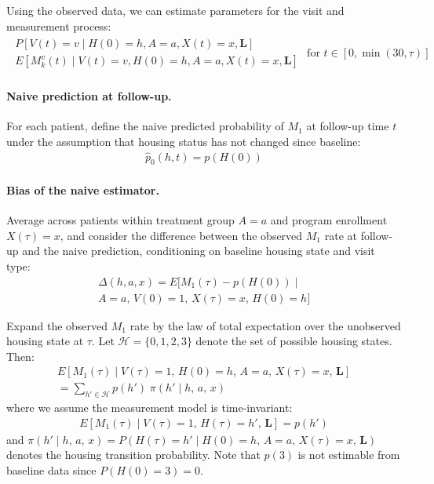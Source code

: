 Using the observed data, we can estimate parameters for the visit and measurement process:
\begin{align*}
    \begin{split}
    P[V(t)=v \mid H(0)=h, A=a, X(t)=x, \boldsymbol{L}] \\
    E[M_k^v(t) \mid V(t)=v, H(0)=h, A=a, X(t)=x, \boldsymbol{L}]
    \end{split} \text{ for } t \in [0, \min(30, \tau)]
\end{align*}

\paragraph{Naive prediction at follow-up.} For each patient, define the naive predicted probability of $M_1$ at follow-up time $t$ under the assumption that housing status has not changed since baseline:
\begin{align*}
    \widehat{p}_0(h, t) = p(H(0))
\end{align*}

\paragraph{Bias of the naive estimator.} Average across patients within treatment group $A=a$ and program enrollment $X(\tau)=x$, and consider the difference between the observed $M_1$ rate at follow-up and the naive prediction, conditioning on baseline housing state and visit type:
\begin{multline*}
    \Delta(h, a, x) = E\big[M_1(\tau) - p(H(0)) \mid \\
    A=a,\, V(0)=1,\, X(\tau)=x,\, H(0)=h\big]
\end{multline*}

Expand the observed $M_1$ rate by the law of total expectation over the unobserved housing state at $\tau$. Let $\mathcal{H} = \{0, 1, 2, 3\}$ denote the set of possible housing states. Then:
\begin{multline*}
    E[M_1(\tau) \mid V(\tau)=1,\, H(0)=h,\, A=a,\, X(\tau)=x,\, \boldsymbol{L}] \\
    = \sum_{h' \in \mathcal{H}} p(h') \; \pi(h' \mid h,\, a,\, x)
\end{multline*}
where we assume the measurement model is time-invariant:
\begin{align*}
    E[M_1(\tau) \mid V(\tau)=1,\, H(\tau)=h',\, \boldsymbol{L}] = p(h')
\end{align*}
and $\pi(h' \mid h,\, a,\, x) = P(H(\tau)=h' \mid H(0)=h,\, A=a,\, X(\tau)=x,\, \boldsymbol{L})$ denotes the housing transition probability. Note that $p(3)$ is not estimable from baseline data since $P(H(0)=3)=0$.

